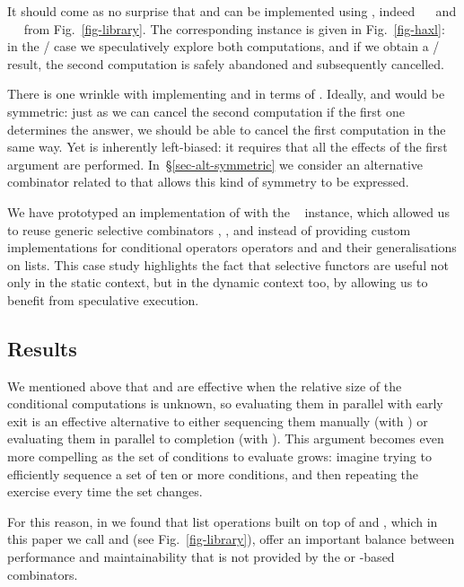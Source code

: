 It should come as no surprise that  and  can be
implemented using , indeed ~\hs{=}~\hs{(<||>)} and
~\hs{=}~\hs{(<&&>)} from Fig.~\ref{fig-library}. The corresponding
 instance is given in Fig.~\ref{fig-haxl}: in the
/ case we speculatively explore both computations,
and if we obtain a / result, the second computation is
safely abandoned and subsequently cancelled.

There is one wrinkle with implementing  and 
in terms of . Ideally,  and  would be
symmetric: just as we can cancel the second computation if the first
one determines the answer, we should be able to cancel the first
computation in the same way. Yet  is inherently left-biased:
it requires that all the effects of the first argument are performed.
In~\S\ref{sec-alt-symmetric} we consider an alternative combinator
related to  that allows this kind of symmetry to be expressed.

We have prototyped an implementation of \Haxl with the ~
instance, which allowed us to reuse generic selective combinators
\hs{<||>}, \hs{<&&>},  and  instead of providing custom
implementations for conditional operators operators  and  and
their generalisations on lists. This case study highlights the fact that
selective functors are useful not only in the static context, but in the dynamic
context too, by allowing us to benefit from speculative execution.

\subsection{Results}

We mentioned above that  and  are effective when the
relative size of the conditional computations is unknown, so
evaluating them in parallel with early exit is an effective
alternative to either sequencing them manually (with ) or
evaluating them in parallel to completion (with
). This argument becomes even more compelling as the
set of conditions to evaluate grows: imagine trying to efficiently
sequence a set of ten or more conditions, and then repeating the
exercise every time the set changes.

For this reason, in \Haxl we found that list operations built on top
of  and , which in this paper we call  and
 (see Fig.~\ref{fig-library}), offer an important balance
between performance and maintainability that is not provided by the
 or -based combinators.

